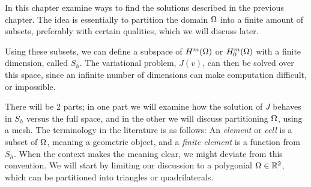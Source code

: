 In this chapter examine ways to find the solutions described in the previous chapter.
The idea is essentially to partition the domain $\Omega$ into a finite amount 
of subsets, preferably with certain qualities, which we will discuss later. 

Using these subsets, we can define a subspace of $H^m(\Omega)$ or $H^m_0(\Omega)$ 
with a finite dimension, called $S_h$. The variational problem, $J(v)$, can then be 
solved over this space, since an infinite number of dimensions can make 
computation difficult, or impossible.

There will be $2$ parts; in one part we 
will examine how the solution of $J$ behaves in $S_h$ versus the full space, 
and in the other we will discuss partitioning $\Omega$, using a mesh.
The terminology in the literature is as follows: An \emph{element} or \emph{cell} is a 
subset of $\Omega$, meaning a geometric object, and a \emph{finite element} is a %
function from $S_h$. When the context makes the meaning clear, we might deviate from 
this convention.
We will start by limiting our discussion to a polygonial $\Omega \in \mathbb{R}^2$, which 
can be partitioned into triangles or quadrilaterals.